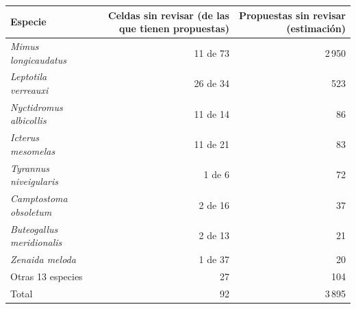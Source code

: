 \begin{tabular}{lrr}
\toprule
Especie & Celdas sin revisar (de las que tienen propuestas) & Propuestas sin revisar (estimaci\'on)\\
\midrule
\textit{Mimus longicaudatus} & 11 de 73 & 2\,950\\
\textit{Leptotila verreauxi} & 26 de 34 & 523\\
\textit{Nyctidromus albicollis} & 11 de 14 & 86\\
\textit{Icterus mesomelas} & 11 de 21 & 83\\
\textit{Tyrannus niveigularis} & 1 de 6 & 72\\
\textit{Camptostoma obsoletum} & 2 de 16 & 37\\
\textit{Buteogallus meridionalis} & 2 de 13 & 21\\
\textit{Zenaida meloda} & 1 de 37 & 20\\
Otras 13 especies & 27 & 104\\
\midrule
Total & 92 & 3\,895\\
\bottomrule
\end{tabular}
